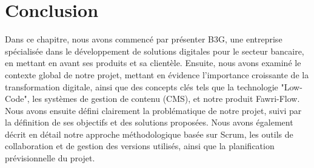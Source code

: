 \newpage

\section*{Conclusion}

\hspace{\parindent}Dans ce chapitre, nous avons commencé par présenter B3G, une entreprise spécialisée dans le développement de solutions digitales pour le secteur bancaire, en mettant en avant ses produits et sa clientèle. Ensuite, nous avons examiné le contexte global de notre projet, mettant en évidence l'importance croissante de la transformation digitale, ainsi que des concepts clés tels que la technologie "Low-Code", les systèmes de gestion de contenu (CMS), et notre produit Fawri-Flow. Nous avons ensuite défini clairement la problématique de notre projet, suivi par la définition de ses objectifs et des solutions proposées. Nous avons également décrit en détail notre approche méthodologique basée sur Scrum, les outils de collaboration et de gestion des versions utilisés, ainsi que la planification prévisionnelle du projet.

